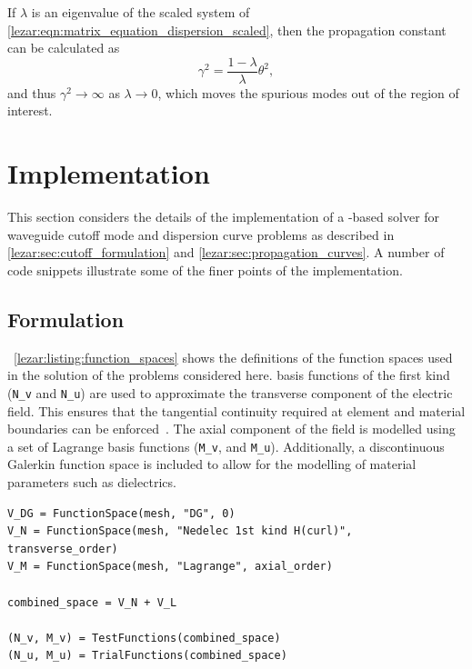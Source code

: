 If $\lambda$ is an eigenvalue of the scaled system of
\eqref{lezar:eqn:matrix_equation_dispersion_scaled}, then the propagation constant can be
calculated as
\begin{equation}
    \gamma^2 = \frac{1 - \lambda}{\lambda}\theta^2,
\end{equation}
and thus $\gamma^2 \rightarrow \infty$ as $\lambda \rightarrow 0$, which moves the spurious modes out of the region of interest. 

\section{Implementation}
\label{lezar:sec:Implementation}

This section considers the details of the
implementation of a \fenics-based solver for waveguide cutoff mode and
dispersion curve problems as described in \ref{lezar:sec:cutoff_formulation}
and \ref{lezar:sec:propagation_curves}. A number of code snippets illustrate
some of the finer points of the implementation.

\subsection{Formulation}
\lstlistingname{}~\ref{lezar:listing:function_spaces} shows the definitions of the function spaces used in the solution of the problems considered here. \nedelec{} basis functions of the first kind ({\tt N\_v} and {\tt N\_u}) are used to approximate the transverse component of the electric field. This ensures that the tangential continuity required at element and material boundaries can be enforced~\cite{Jin2002}.  The axial component of the field is modelled using a set of Lagrange basis functions ({\tt M\_v}, and {\tt M\_u}). Additionally, a discontinuous Galerkin function space is included to allow for the modelling of material parameters such as dielectrics.
\begin{lstlisting}[float=ht,caption=Function spaces and basis functions.,label=lezar:listing:function_spaces]
V_DG = FunctionSpace(mesh, "DG", 0) 
V_N = FunctionSpace(mesh, "Nedelec 1st kind H(curl)", transverse_order) 
V_M = FunctionSpace(mesh, "Lagrange", axial_order)

combined_space = V_N + V_L

(N_v, M_v) = TestFunctions(combined_space)
(N_u, M_u) = TrialFunctions(combined_space)
\end{lstlisting}

